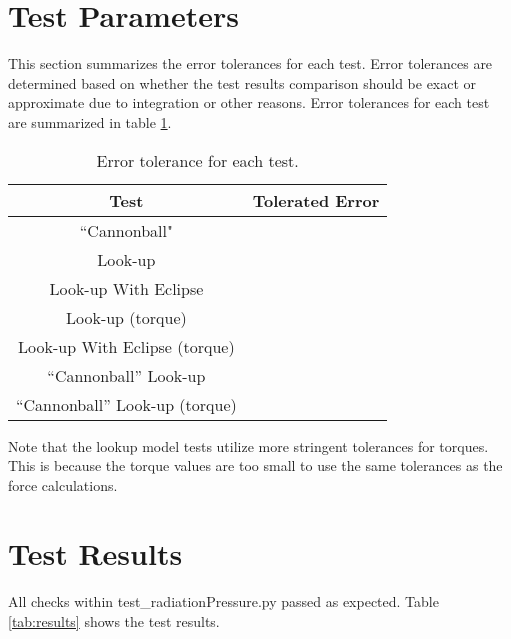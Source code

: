 \section{Test Parameters}

This section summarizes the error tolerances for each test. Error tolerances are determined based on whether the test results comparison should be exact or approximate due to integration or other reasons. Error tolerances for each test are summarized in table \ref{tab:errortol}. 

\begin{table}[htbp]
	\caption{Error tolerance for each test.}
	\label{tab:errortol}
	\centering \fontsize{10}{10}\selectfont
	\begin{tabular}{ c | c } %
		\hline
		\textbf{Test}   	      	               & \textbf{Tolerated Error} 						           \\ \hline
		``Cannonball"                           &	 			  \\ \hline
		Look-up						                & 		   				\\ \hline
		Look-up With Eclipse	             &     \\ \hline
		Look-up	(torque)			               & 		   				\\ \hline
		Look-up With Eclipse (torque)	&     \\ \hline
		``Cannonball'' Look-up				& \\ \hline
		``Cannonball'' Look-up (torque)& \\ \hline
	\end{tabular}
\end{table}

\noindent Note that the lookup model tests utilize more stringent tolerances for torques. This is because the torque values are too small to use the same tolerances as the force calculations.



\section{Test Results}

All checks within test\_radiationPressure.py passed as expected. Table \ref{tab:results} shows the test results.

